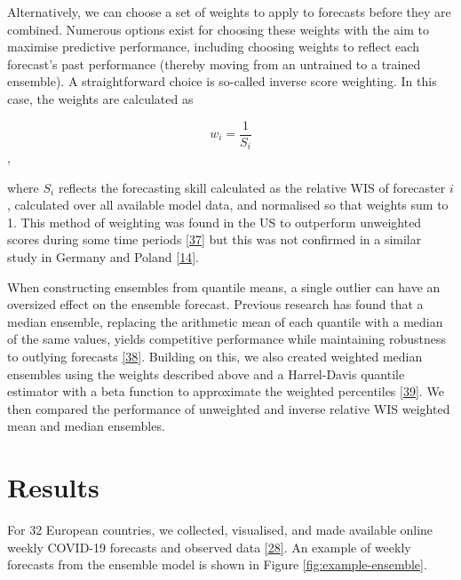 \documentclass[
]{article}
\begin{document}
Alternatively, we can choose a set of weights to apply to forecasts before they are combined. Numerous options exist for choosing these weights with the aim to maximise predictive performance, including choosing weights to reflect each forecast's past performance (thereby moving from an untrained to a trained ensemble). A straightforward choice is so-called inverse score weighting. In this case, the weights are calculated as

\[w_i = \frac{1}{S_i}\] ,

where \(S_i\) reflects the forecasting skill calculated as the relative WIS of forecaster \(i\), calculated over all available model data, and normalised so that weights sum to 1. This method of weighting was found in the US to outperform unweighted scores during some time periods \protect\hyperlink{ref-taylorCombiningProbabilisticForecasts2021}{{[}37{]}} but this was not confirmed in a similar study in Germany and Poland \protect\hyperlink{ref-bracherPreregisteredShorttermForecasting2021}{{[}14{]}}.

When constructing ensembles from quantile means, a single outlier can have an oversized effect on the ensemble forecast. Previous research has found that a median ensemble, replacing the arithmetic mean of each quantile with a median of the same values, yields competitive performance while maintaining robustness to outlying forecasts \protect\hyperlink{ref-rayComparingTrainedUntrained2022}{{[}38{]}}. Building on this, we also created weighted median ensembles using the weights described above and a Harrel-Davis quantile estimator with a beta function to approximate the weighted percentiles \protect\hyperlink{ref-harrellNewDistributionfreeQuantile1982}{{[}39{]}}. We then compared the performance of unweighted and inverse relative WIS weighted mean and median ensembles.

\hypertarget{results}{%
\section{Results}\label{results}}

For 32 European countries, we collected, visualised, and made available online weekly COVID-19 forecasts and observed data \protect\hyperlink{ref-katharine_sherratt_2022_7356267}{{[}28{]}}. An example of weekly forecasts from the ensemble model is shown in Figure \ref{fig:example-ensemble}.
\end{document}
